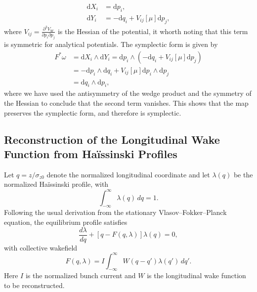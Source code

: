 \documentclass[11pt,a4paper]{article}
\begin{document}
\begin{sloppypar}
\begin{equation}
\begin{aligned}
\mathrm{d}X_i &= \mathrm{d}p_i,\\
\mathrm{d}Y_i &= -\mathrm{d}q_i + V_{ij}[\mu] \mathrm{d}p_j,
\end{aligned}
\end{equation}
where $V_{ij} = \frac{\partial^2 V_W}{\partial p_i \partial p_j}$ is the Hessian of the potential, it whorth noting that this term is symmetric for analytical potentials. The symplectic form is given by
\begin{equation}
\begin{aligned}
F^*\omega &= \mathrm{d}X_i \wedge \mathrm{d}Y_i
=
\mathrm{d}p_i \wedge \left(-\mathrm{d}q_i + V_{ij}[\mu] \mathrm{d}p_j\right)\\
&=
-\mathrm{d}p_i \wedge \mathrm{d}q_i + V_{ij}[\mu] \mathrm{d}p_i \wedge \mathrm{d}p_j\\
&=
\mathrm{d}q_i \wedge \mathrm{d}p_i,
\end{aligned}
\end{equation}
where we have used the antisymmetry of the wedge product and the symmetry of the Hessian to conclude that the second term vanishes. This shows that the map preserves the symplectic form, and therefore is symplectic.


\subsection{Reconstruction of the Longitudinal Wake Function from Ha\"issinski Profiles}

Let $q=z/\sigma_{z0}$ denote the normalized longitudinal coordinate and let $\lambda(q)$ be the normalized Ha\"issinski profile, with
\begin{equation}
\int_{-\infty}^{\infty} \lambda(q)\,dq = 1.
\end{equation}
Following the usual derivation from the stationary Vlasov--Fokker--Planck equation, the equilibrium profile satisfies
\begin{equation}
\frac{d\lambda}{dq} + \left[q - F(q,\lambda)\right]\lambda(q)=0,
\end{equation}
with collective wakefield 
\begin{equation}
F(q,\lambda)= I \int_{-\infty}^{\infty} W(q-q')\lambda(q')\,dq'.
\label{eq:continuous_convolution}
\end{equation}
Here $I$ is the normalized bunch current and $W$ is the longitudinal wake function to be reconstructed.


\end{sloppypar}
\end{document}
